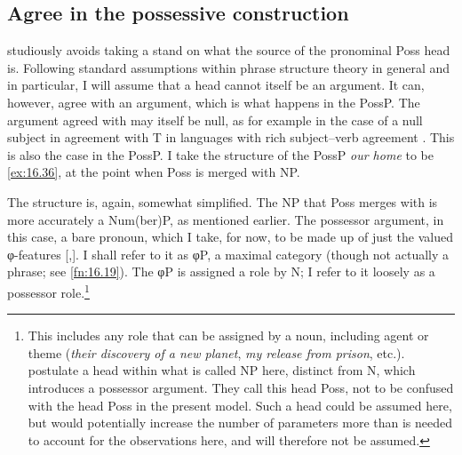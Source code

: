 \documentclass[output=paper]{langsci/langscibook}
\begin{document}
\subsection{Agree in the possessive construction}\label{sec:16.3.3}

\citet{Delsing1998} studiously avoids taking a stand on what the source of the
pronominal Poss head is. Following standard assumptions within phrase structure
theory in general and \citet{Roberts2010} in particular, I will assume that a
head cannot itself be an argument. It can, however, agree with an argument,
which is what happens in the PossP. The argument agreed with may itself be
null, as for example in the case of a null subject in agreement with T in
languages with rich subject--verb agreement
\citep[passim]{BibHolRobShee2010}.  This is also the case in the PossP.
I take the structure of the PossP \emph{our home} to be \eqref{ex:16.36},
at the point when Poss is merged with NP.

\ea\label{ex:16.36}
\z

The structure is, again, somewhat simplified. The NP that Poss merges with is
more accurately a Num(ber)P, as mentioned earlier. The possessor argument, in
this case, a bare pronoun, which I take, for now, to be made up of just the
valued φ-features [\First,\Pl{}]. I shall refer to it as φP, a maximal category
(though not actually a phrase; see \cref{fn:16.19}). The φP is assigned a role by N; I
refer to it loosely as a possessor role.\footnote{This includes any role that
    can be assigned by a noun, including agent or theme (\emph{their discovery
    of a new planet}, \emph{my release from prison}, etc.).
    \citet{AleHaeSta2007} postulate a head within what is called NP here,
    distinct from N, which introduces a possessor argument. They call this head
    Poss, not to be confused with the head Poss in the present model. Such a
    head could be assumed here, but would potentially increase the number of
parameters more than is needed to account for the observations here, and will
therefore not be assumed.\label{fn:16.18}}
\end{document}
